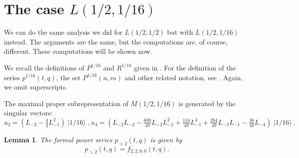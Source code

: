 \documentclass[a4paper, 12pt, reqno]{amsart}
\newtheorem{lemma}[theorem]{Lemma}
\theoremstyle{remark}
\DeclareMathOperator{\vacsixteen}{|1/16\rangle}
\begin{document}
\section{The case $L(1/2, 1/16)$}
\label{sec:case-l12-116}

We can do the same analysis we did for $L(1/2, 1/2)$ but with $L(1/2, 1/16)$ instead.
The arguments are the same, but the computations are, of course, different.
These computations will be shown now.

We recall the definitions of $P^{1/16}$ and $R^{1/16}$ given in .
For the definition of the series $p^{1/16}(t, q)$, the set $P^{1/16}(n, m)$ and other related notation, see .
Again, we omit superscripts.

The maximal proper subrepresentation of $M(1/2, 1/16)$ is generated by the singular vectors:
\begin{equation*}
  u_2 = (L_{-2} - \tfrac{4}{3}L_{-1}^2)\vacsixteen, u_4 = (L_{-2}L_{-2} - \tfrac{600}{49}L_{-2}L_{-1}^2 + \tfrac{144}{49}L_{-1}^4 + \tfrac{264}{49}L_{-3}L_{-1} - \tfrac{36}{49}L_{-4})\vacsixteen.
\end{equation*}

\begin{lemma}
  \label{lmm:40}
  The formal power series $p_{>2}(t, q)$ is given by
  \begin{equation*}
    p_{>2}(t, q) = f_{2, 2, 0, 0}(t, q).
  \end{equation*}
\end{lemma}
\end{document}
